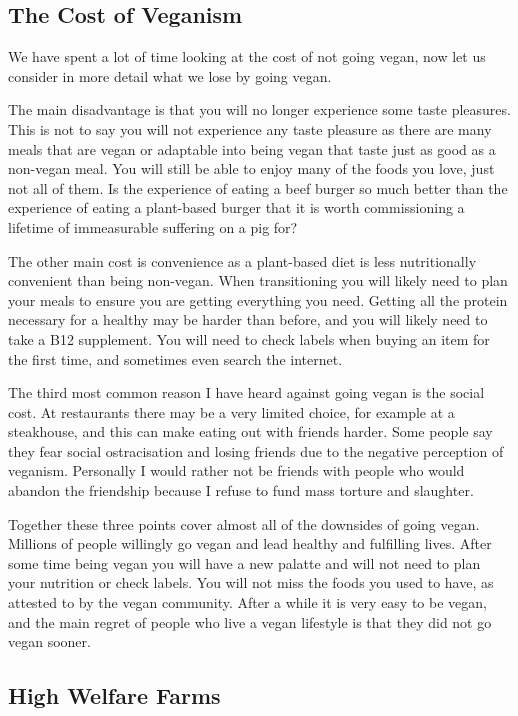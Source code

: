 \subsection{The Cost of Veganism}
\label{sec:TheCostOfVeganism}

We have spent a lot of time looking at the cost of not going vegan, now let us consider in more detail what we lose by going vegan.

The main disadvantage is that you will no longer experience some taste pleasures. This is not to say you will not experience any taste pleasure as there are many meals that are vegan or adaptable into being vegan that taste just as good as a non-vegan meal. You will still be able to enjoy many of the foods you love, just not all of them. Is the experience of eating a beef burger so much better than the experience of eating a plant-based burger that it is worth commissioning a lifetime of immeasurable suffering on a pig for?

The other main cost is convenience as a plant-based diet is less nutritionally convenient than being non-vegan. When transitioning you will likely need to plan your meals to ensure you are getting everything you need. Getting all the protein necessary for a healthy may be harder than before, and you will likely need to take a B12 supplement. You will need to check labels when buying an item for the first time, and sometimes even search the internet.

The third most common reason I have heard against going vegan is the social cost. At restaurants there may be a very limited choice, for example at a steakhouse, and this can make eating out with friends harder. Some people say they fear social ostracisation and losing friends due to the negative perception of veganism. Personally I would rather not be friends with people who would abandon the friendship because I refuse to fund mass torture and slaughter.

Together these three points cover almost all of the downsides of going vegan. Millions of people willingly go vegan and lead healthy and fulfilling lives. After some time being vegan you will have a new palatte and will not need to plan your nutrition or check labels. You will not miss the foods you used to have, as attested to by the vegan community. After a while it is very easy to be vegan, and the main regret of people who live a vegan lifestyle is that they did not go vegan sooner.

\subsection{High Welfare Farms}

